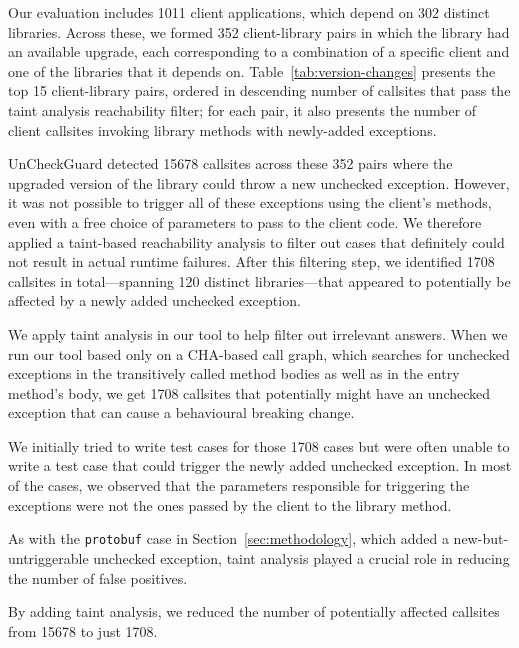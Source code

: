 Our evaluation includes 1011 client applications, which depend on 302 distinct libraries. Across these, we formed 352 client-library pairs in which the library had an available upgrade, each corresponding to a combination of a specific client and one of the libraries that it depends on. Table~\ref{tab:version-changes} presents the top 15 client-library pairs, ordered in descending number of callsites that pass the taint analysis reachability filter; for each pair, it also presents the number of client callsites invoking library methods with newly-added exceptions.

UnCheckGuard detected 15678 callsites across these 352 pairs where the upgraded version of the library could throw a new unchecked exception. However, it was not possible to trigger all of these exceptions using the client's methods, even with a free choice of parameters to pass to the client code. We therefore applied a taint-based reachability analysis to filter out cases that definitely could not result in actual runtime failures. After this filtering step, we identified 1708 callsites in total—spanning 120 distinct libraries—that appeared to potentially be affected by a newly added unchecked exception.

We apply taint analysis in our tool to help filter out irrelevant answers. When we run our tool based only on a CHA-based call graph, which
searches for unchecked exceptions in the transitively called method bodies as well as in the entry method's body, we get
1708 callsites that potentially might have an unchecked exception that can cause a behavioural breaking change.

We initially tried to write test cases for those 1708 cases but were often unable to write a test case that could trigger
the newly added unchecked exception. In most of the cases, we observed that the parameters responsible for triggering the 
exceptions were not the ones passed by the client to the library method.

As with the \texttt{protobuf} case in Section~\ref{sec:methodology}, which added a new-but-untriggerable unchecked exception, taint analysis played a crucial role in reducing the number of false positives.

\vspace{1em}
\begin{tcolorbox}[colback=gray!10, colframe=black]
By adding taint analysis, we reduced the number of potentially affected callsites from 15678 to just 1708.
\end{tcolorbox}
\vspace{1em}

